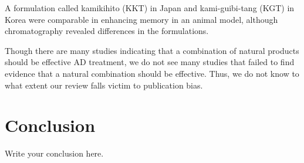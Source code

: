 \documentclass[twocolumn]{article}
\begin{document}
A formulation called kamikihito (KKT) in Japan
and kami-guibi-tang (KGT) in Korea
were comparable in enhancing memory in an animal model,
although chromatography revealed differences in the formulations.
\cite{watari2015comparing}


Though there are many studies indicating that
a combination of natural products should be effective
AD treatment, we do not see many studies that
failed to find evidence that a natural combination
should be effective.
Thus, we do not know to what extent our review falls victim
to publication bias.







\section{Conclusion}
Write your conclusion here.












\end{document}
